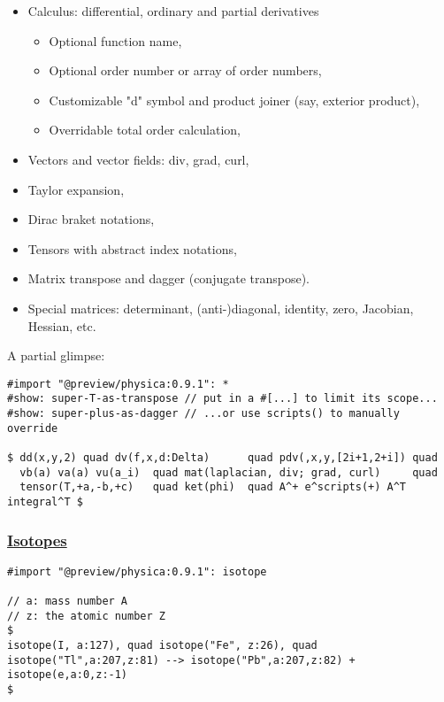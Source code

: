 \begin{itemize}
\tightlist
\item
  Calculus: differential, ordinary and partial derivatives

  \begin{itemize}
  \tightlist
  \item
    Optional function name,
  \item
    Optional order number or array of order numbers,
  \item
    Customizable "d" symbol and product joiner (say, exterior product),
  \item
    Overridable total order calculation,
  \end{itemize}
\item
  Vectors and vector fields: div, grad, curl,
\item
  Taylor expansion,
\item
  Dirac braket notations,
\item
  Tensors with abstract index notations,
\item
  Matrix transpose and dagger (conjugate transpose).
\item
  Special matrices: determinant, (anti-)diagonal, identity, zero,
  Jacobian, Hessian, etc.
\end{itemize}

A partial glimpse:

\begin{verbatim}
#import "@preview/physica:0.9.1": *
#show: super-T-as-transpose // put in a #[...] to limit its scope...
#show: super-plus-as-dagger // ...or use scripts() to manually override

$ dd(x,y,2) quad dv(f,x,d:Delta)      quad pdv(,x,y,[2i+1,2+i]) quad
  vb(a) va(a) vu(a_i)  quad mat(laplacian, div; grad, curl)     quad
  tensor(T,+a,-b,+c)   quad ket(phi)  quad A^+ e^scripts(+) A^T integral^T $
\end{verbatim}

\pandocbounded{}

\subsubsection{\texorpdfstring{\hyperref[isotopes]{Isotopes}}{Isotopes}}\label{isotopes}

\begin{verbatim}
#import "@preview/physica:0.9.1": isotope

// a: mass number A
// z: the atomic number Z
$
isotope(I, a:127), quad isotope("Fe", z:26), quad
isotope("Tl",a:207,z:81) --> isotope("Pb",a:207,z:82) + isotope(e,a:0,z:-1)
$
\end{verbatim}

